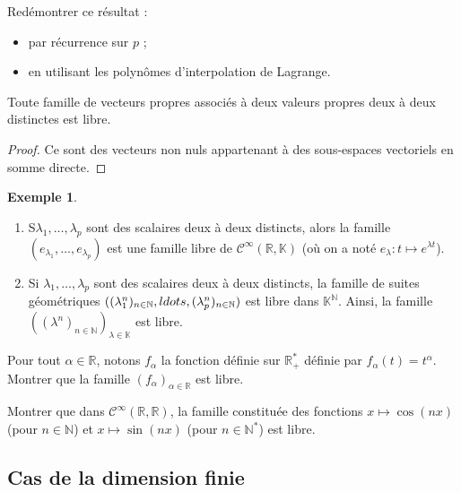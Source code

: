\documentclass[french]{article}
\newcommand{\N}{\mathbb{N}}
\newcommand{\R}{\mathbb{R}}
\newcommand{\K}{\mathbb{K}}
\newcommand{\st}{^*}
\theoremstyle{plain}
\theoremstyle{definition}
\newtheorem*{ex}{Exemple}
\theoremstyle{remark}
\begin{document}
	\begin{exo}
		Redémontrer ce résultat :
		\begin{itemize}
			\item par récurrence sur $p$ ;
			\item en utilisant les polynômes d'interpolation de Lagrange.
		\end{itemize}
	\end{exo}
	
	\begin{cor}%
		Toute famille de vecteurs propres associés à deux valeurs propres deux à deux distinctes est libre.
	\end{cor}
	\begin{proof}
		Ce sont des vecteurs non nuls appartenant à des sous-espaces vectoriels en somme directe.
	\end{proof}
	
	\begin{ex}
		\begin{enumerate}
			\item S$\lambda_1,\ldots,\lambda_p$ sont des scalaires deux à deux distincts, alors la famille $(e_{\lambda_1},\ldots,e_{\lambda_p})$ est une famille libre de $\mathcal{C}^\infty(\R,\K)$ (où on a noté $e_{\lambda}:t\mapsto e^{\lambda t}$).
			\item Si $\lambda_1,\ldots,\lambda_p$ sont des scalaires deux à deux distincts, la famille de suites géométriques $((\lambda_1^n)_{n\in\N},\\ldots,(\lambda_p^n)_{n\in\N})$ est libre dans $\K^\N$. Ainsi, la famille $((\lambda^n)_{n\in\N})_{\lambda\in\K}$ est libre.
		\end{enumerate}
	\end{ex}
	
	\begin{exo}
		Pour tout $\alpha\in\R$, notons $f_\alpha$ la fonction définie sur $\R_+\st$ définie par $f_\alpha(t)=t^\alpha$. Montrer que la famille $(f_\alpha)_{\alpha\in\R}$ est libre.
	\end{exo}
	
	\begin{exo}
		Montrer que dans $\mathcal{C}^\infty(\R,\R)$, la famille constituée des fonctions $x\mapsto\cos(nx)$ (pour $n\in\N$) et $x\mapsto\sin(nx)$ (pour $n\in\N\st$) est libre. %
	\end{exo}
	
	\subsection{Cas de la dimension finie}
	
\end{document}

